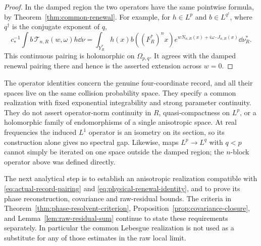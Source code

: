 \begin{proof}
In the damped region the two operators have the same pointwise formula,
by Theorem~\ref{thm:common-renewal}. For example, for $h\in L^p$ and
$b\in L^{q^\dagger}$, where $q^\dagger$ is the conjugate exponent of $q$,
\[
 c_*^{-1}\int b\,\mathcal T_{n,R}(w,\omega)h\dd\nu
 =\int_{Y_R^*}h(x)b((F_R^*)^nx)
       e^{wN_{n,R}(x)+i\omega\cdot J_{n,R}(x)}\dd\nu_R^*.
\]
This continuous pairing is holomorphic on $\Omega_{p,q}$. It agrees
with the damped renewal pairing there and hence is the asserted
extension across $w=0$.
\end{proof}

\begin{remark}
The operator identities concern the genuine four-coordinate record,
and all their spaces live on the same collision probability space.
They specify a common realization with fixed exponential integrability
and strong parameter continuity. They do not assert operator-norm
continuity in $R$, quasi-compactness on $L^p$, or a holomorphic family of
endomorphisms of a single anisotropic space. At real frequencies the
induced $L^1$ operator is an isometry on its section, so its construction
alone gives no spectral gap. Likewise, maps $L^p\to L^q$ with $q<p$
cannot simply be iterated on one space outside the damped region; the
$n$-block operator above was defined directly.

The next analytical step is to establish an anisotropic realization
compatible with \eqref{eq:actual-record-pairing} and
\eqref{eq:physical-renewal-identity}, and to prove its phase
reconstruction, covariance and raw-residual bounds. The criteria in
Theorem~\ref{thm:phase-resolvent-criterion},
Proposition~\ref{prop:covariance-closure}, and
Lemma~\ref{lem:raw-residual-sum} continue to state these requirements
separately. In particular the common Lebesgue realization is not used
as a substitute for any of those estimates in the raw local limit.
\end{remark}
